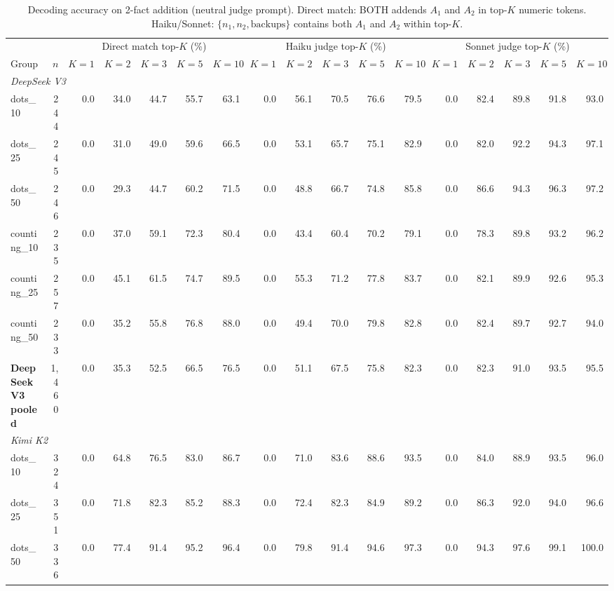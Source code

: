 \begin{table}[h]
\centering
\small
\caption{Decoding accuracy on 2-fact addition (neutral judge prompt). Direct match: BOTH addends $A_1$ and $A_2$ in top-$K$ numeric tokens. Haiku/Sonnet: $\{n_1, n_2, \textrm{backups}\}$ contains both $A_1$ and $A_2$ within top-$K$.}
\label{tab:decode_2fact}
\begin{tabular}{l r r r r r r r r r r r r r r r r}
\toprule
& & \multicolumn{5}{c}{Direct match top-$K$ (\%)} & \multicolumn{5}{c}{Haiku judge top-$K$ (\%)} & \multicolumn{5}{c}{Sonnet judge top-$K$ (\%)} \\
\cmidrule(lr){3-7} \cmidrule(lr){8-12} \cmidrule(lr){13-17}
Group & $n$ & $K{=}1$ & $K{=}2$ & $K{=}3$ & $K{=}5$ & $K{=}10$ & $K{=}1$ & $K{=}2$ & $K{=}3$ & $K{=}5$ & $K{=}10$ & $K{=}1$ & $K{=}2$ & $K{=}3$ & $K{=}5$ & $K{=}10$ \\
\midrule
\multicolumn{17}{l}{\textit{DeepSeek V3}} \\
dots\_10 & 244 & 0.0 & 34.0 & 44.7 & 55.7 & 63.1 & 0.0 & 56.1 & 70.5 & 76.6 & 79.5 & 0.0 & 82.4 & 89.8 & 91.8 & 93.0 \\
dots\_25 & 245 & 0.0 & 31.0 & 49.0 & 59.6 & 66.5 & 0.0 & 53.1 & 65.7 & 75.1 & 82.9 & 0.0 & 82.0 & 92.2 & 94.3 & 97.1 \\
dots\_50 & 246 & 0.0 & 29.3 & 44.7 & 60.2 & 71.5 & 0.0 & 48.8 & 66.7 & 74.8 & 85.8 & 0.0 & 86.6 & 94.3 & 96.3 & 97.2 \\
counting\_10 & 235 & 0.0 & 37.0 & 59.1 & 72.3 & 80.4 & 0.0 & 43.4 & 60.4 & 70.2 & 79.1 & 0.0 & 78.3 & 89.8 & 93.2 & 96.2 \\
counting\_25 & 257 & 0.0 & 45.1 & 61.5 & 74.7 & 89.5 & 0.0 & 55.3 & 71.2 & 77.8 & 83.7 & 0.0 & 82.1 & 89.9 & 92.6 & 95.3 \\
counting\_50 & 233 & 0.0 & 35.2 & 55.8 & 76.8 & 88.0 & 0.0 & 49.4 & 70.0 & 79.8 & 82.8 & 0.0 & 82.4 & 89.7 & 92.7 & 94.0 \\
\addlinespace[2pt]
\textbf{DeepSeek V3 pooled} & 1,460 & 0.0 & 35.3 & 52.5 & 66.5 & 76.5 & 0.0 & 51.1 & 67.5 & 75.8 & 82.3 & 0.0 & 82.3 & 91.0 & 93.5 & 95.5 \\
\multicolumn{17}{l}{\textit{Kimi K2}} \\
dots\_10 & 324 & 0.0 & 64.8 & 76.5 & 83.0 & 86.7 & 0.0 & 71.0 & 83.6 & 88.6 & 93.5 & 0.0 & 84.0 & 88.9 & 93.5 & 96.0 \\
dots\_25 & 351 & 0.0 & 71.8 & 82.3 & 85.2 & 88.3 & 0.0 & 72.4 & 82.3 & 84.9 & 89.2 & 0.0 & 86.3 & 92.0 & 94.0 & 96.6 \\
dots\_50 & 336 & 0.0 & 77.4 & 91.4 & 95.2 & 96.4 & 0.0 & 79.8 & 91.4 & 94.6 & 97.3 & 0.0 & 94.3 & 97.6 & 99.1 & 100.0 \\

\end{tabular}
\end{table}
